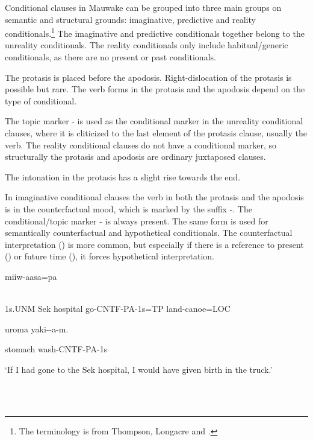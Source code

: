 Conditional clauses in Mauwake can be grouped into three main groups on semantic and structural grounds: imaginative, predictive and reality conditionals.\footnote{The terminology is from Thompson, Longacre and \citet[255]{Hwang2007}.} The imaginative and predictive conditionals together belong to the unreality conditionals. The reality conditionals only include habitual/generic conditionals, as there are no present or past conditionals.

The protasis is placed before the apodosis. Right-dislocation of the protasis is possible but rare. The verb forms in the protasis and the apodosis depend on the type of conditional.

The topic marker - is used as the conditional marker in the unreality conditional clauses, where it is cliticized to the last element of the protasis clause, usually the verb. The reality conditional clauses do not have a conditional marker, so structurally the protasis and apodosis are ordinary juxtaposed clauses. 

The intonation in the protasis has a slight rise towards the end.  

In imaginative conditional clauses the verb in both the protasis and the apodosis is in the counterfactual mood, which is marked by the suffix -. The conditional/topic marker - is always present. The same form is used for semantically counterfactual and hypothetical conditionals. The counterfactual interpretation () is more common, but especially if there is a reference to present () or future time (), it forces hypothetical interpretation.

\ea%
\label{ex:x1645}
\gll [Yo  Sek  haussik  ikiw-\textstyleEmphasizedVernacularWords{ek}-a-m=\textstyleEmphasizedVernacularWords{na}]  miiw-aasa=pa \\
      \\
\glt
\z

1s.UNM  Sek  hospital  go-CNTF-PA-1s=TP  land-canoe=LOC

uroma  yaki--a-m.

stomach  wash-CNTF-PA-1s

`If I had gone to the Sek hospital, I would have given birth in the truck.'

\ea%
\label{ex:x1646}
\gll [Yena  aamun  aakisa  uruf-\textstyleEmphasizedVernacularWords{ek}-a-m=\textstyleEmphasizedVernacularWords{na}]  \\
      \\
\glt
\z

